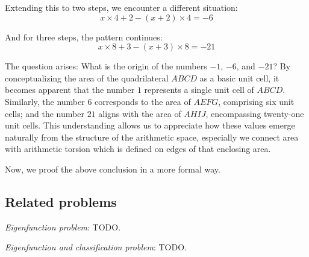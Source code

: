 Extending this to two steps, we encounter a different situation:
\begin{equation}
    x \times 4 + 2 - (x + 2) \times 4 = -6
\end{equation}

And for three steps, the pattern continues:
\begin{equation}
    x \times 8 + 3 - (x + 3) \times 8 = -21
\end{equation}

The question arises: What is the origin of the numbers $-1$, $-6$, and $-21$? By conceptualizing the area of the quadrilateral $ABCD$ as a basic unit cell,
it becomes apparent that the number $1$ represents a single unit cell of $ABCD$.
Similarly, the number $6$ corresponds to the area of $AEFG$, comprising six unit cells;
and the number $21$ aligns with the area of $AHIJ$, encompassing twenty-one unit cells.
This understanding allows us to appreciate how these values emerge naturally from the structure of the arithmetic space,
especially we connect area with arithmetic torsion which is defined on edges of that enclosing area.

Now, we proof the above conclusion in a more formal way.



\subsection{Related problems}

\emph{Eigenfunction problem}: TODO.

\emph{Eigenfunction and classification problem}: TODO.

\newpage
